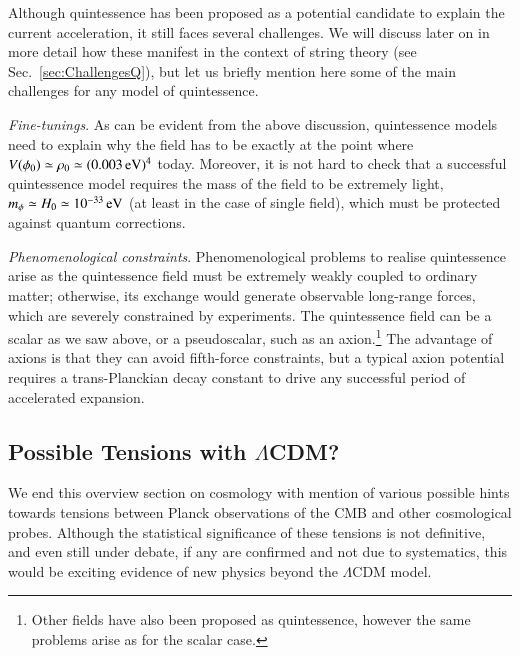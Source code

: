 Although quintessence has been proposed as a potential candidate to explain the current acceleration, it still faces several challenges. We will discuss later on  in more detail how these manifest  in the context of string theory (see Sec.~\ref{sec:ChallengesQ}), but let us briefly mention here some of the main challenges for any model of quintessence.
\bi
 \item {\em Fine-tunings}. As can be evident from the above discussion, quintessence models need to explain why the field has to be exactly at the point where $V(\phi_0) \simeq \rho_0 \simeq (0.003 \,{\rm eV})^4$ today. Moreover, it is not hard to check that a successful quintessence model requires the mass of the field to be extremely light, $m_\phi\simeq H_0\simeq 10^{-33}\,{\rm eV}$ (at least in the case of single field), which must be protected against quantum corrections.

\item {\em Phenomenological constraints}. Phenomenological problems to realise quintessence arise as the quintessence field must be extremely weakly coupled to ordinary matter;  otherwise, its exchange would generate observable long-range forces, which are severely constrained by experiments.
The quintessence field can be a scalar as we saw above, or a pseudoscalar, such as an axion.\footnote{Other fields have also been proposed as quintessence, however the same problems arise as for the scalar case.} The advantage of axions is that they can avoid  fifth-force constraints, but a typical axion potential requires a trans-Planckian decay constant to drive any successful period of accelerated expansion.
\ei


\subsection{Possible Tensions with $\Lambda$CDM?}

We end this overview section on cosmology with mention of various possible hints towards tensions between Planck observations of the CMB and other cosmological probes.  Although the statistical significance of these tensions is not definitive, and even still under debate, if any are confirmed and not due to systematics, this would be exciting evidence of new physics beyond the $\Lambda$CDM model.  

